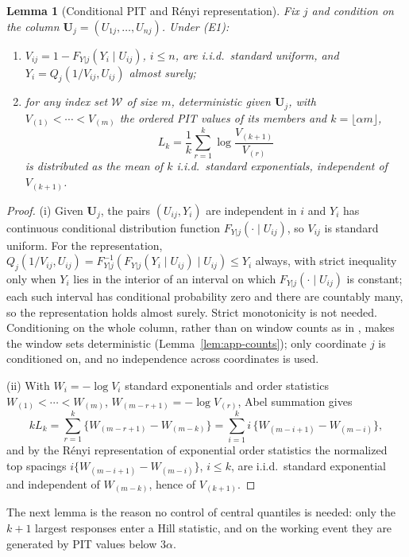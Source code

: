 \documentclass[bj,authoryear]{imsart}
\theoremstyle{plain}
\newtheorem{lemma}[theorem]{Lemma}
\begin{document}
\begin{appendix}
\begin{lemma}[Conditional PIT and R\'enyi representation]\label{lem:app-pit}
Fix $j$ and condition on the column $\bm U_j=(U_{1j},\ldots,U_{nj})$.
Under (E1):
\begin{enumerate}
\item $V_{ij}=1-F_{Y|j}(Y_i\mid U_{ij})$, $i\le n$, are i.i.d.\ standard
uniform, and $Y_i=Q_j(1/V_{ij},U_{ij})$ almost surely;
\item for any index set $\mathcal W$ of size $m$, deterministic given
$\bm U_j$, with $V_{(1)}<\cdots<V_{(m)}$ the ordered PIT values of its
members and $k=\lfloor\alpha m\rfloor$,
\[
 L_k=\frac1k\sum_{r=1}^k\log\frac{V_{(k+1)}}{V_{(r)}}
\]
is distributed as the mean of $k$ i.i.d.\ standard exponentials,
independent of $V_{(k+1)}$.
\end{enumerate}
\end{lemma}

\begin{proof}
(i) Given $\bm U_j$, the pairs $(U_{ij},Y_i)$ are independent in $i$ and
$Y_i$ has continuous conditional distribution function
$F_{Y|j}(\cdot\mid U_{ij})$, so $V_{ij}$ is standard uniform.  For the
representation, $Q_j(1/V_{ij},U_{ij})=F_{Y|j}^{-1}(F_{Y|j}(Y_i\mid
U_{ij})\mid U_{ij})\le Y_i$ always, with strict inequality only when
$Y_i$ lies in the interior of an interval on which
$F_{Y|j}(\cdot\mid U_{ij})$ is constant; each such interval has
conditional probability zero and there are countably many, so the
representation holds almost surely.  Strict monotonicity is not needed.
Conditioning on the whole column, rather than on window counts as in
\citet[Appendix, Lemma~4]{gardesPodgorny2025}, makes the window sets
deterministic (Lemma~\ref{lem:app-counts}); only coordinate $j$ is
conditioned on, and no independence across coordinates is used.

(ii) With $W_i=-\log V_i$ standard exponentials and order statistics
$W_{(1)}<\cdots<W_{(m)}$, $W_{(m-r+1)}=-\log V_{(r)}$, Abel summation
gives
\[
 kL_k=\sum_{r=1}^k\{W_{(m-r+1)}-W_{(m-k)}\}
 =\sum_{i=1}^k i\,\{W_{(m-i+1)}-W_{(m-i)}\},
\]
and by the R\'enyi representation of exponential order statistics
\citep{renyi1953} the normalized top spacings
$i\{W_{(m-i+1)}-W_{(m-i)}\}$, $i\le k$, are i.i.d.\ standard exponential
and independent of $W_{(m-k)}$, hence of $V_{(k+1)}$.
\end{proof}

The next lemma is the reason no control of central quantiles is needed:
only the $k+1$ largest responses enter a Hill statistic, and on the
working event they are generated by PIT values below $3\alpha$.


\end{appendix}
\end{document}
